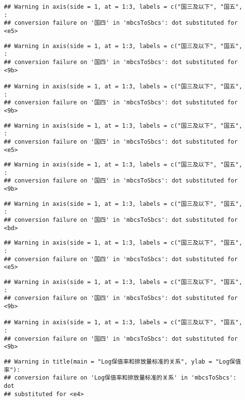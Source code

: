 \documentclass[]{article}
\begin{document}
\begin{verbatim}
## Warning in axis(side = 1, at = 1:3, labels = c("国三及以下", "国五", :
## conversion failure on '国四' in 'mbcsToSbcs': dot substituted for <e5>
\end{verbatim}

\begin{verbatim}
## Warning in axis(side = 1, at = 1:3, labels = c("国三及以下", "国五", :
## conversion failure on '国四' in 'mbcsToSbcs': dot substituted for <9b>

## Warning in axis(side = 1, at = 1:3, labels = c("国三及以下", "国五", :
## conversion failure on '国四' in 'mbcsToSbcs': dot substituted for <9b>
\end{verbatim}

\begin{verbatim}
## Warning in axis(side = 1, at = 1:3, labels = c("国三及以下", "国五", :
## conversion failure on '国四' in 'mbcsToSbcs': dot substituted for <e5>
\end{verbatim}

\begin{verbatim}
## Warning in axis(side = 1, at = 1:3, labels = c("国三及以下", "国五", :
## conversion failure on '国四' in 'mbcsToSbcs': dot substituted for <9b>
\end{verbatim}

\begin{verbatim}
## Warning in axis(side = 1, at = 1:3, labels = c("国三及以下", "国五", :
## conversion failure on '国四' in 'mbcsToSbcs': dot substituted for <bd>
\end{verbatim}

\begin{verbatim}
## Warning in axis(side = 1, at = 1:3, labels = c("国三及以下", "国五", :
## conversion failure on '国四' in 'mbcsToSbcs': dot substituted for <e5>
\end{verbatim}

\begin{verbatim}
## Warning in axis(side = 1, at = 1:3, labels = c("国三及以下", "国五", :
## conversion failure on '国四' in 'mbcsToSbcs': dot substituted for <9b>

## Warning in axis(side = 1, at = 1:3, labels = c("国三及以下", "国五", :
## conversion failure on '国四' in 'mbcsToSbcs': dot substituted for <9b>
\end{verbatim}

\begin{verbatim}
## Warning in title(main = "Log保值率和排放量标准的关系", ylab = "Log保值率"):
## conversion failure on 'Log保值率和排放量标准的关系' in 'mbcsToSbcs': dot
## substituted for <e4>
\end{verbatim}
\end{document}
